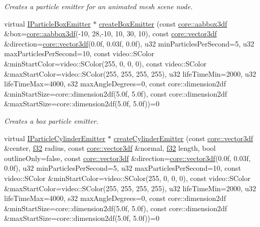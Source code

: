 \begin{DoxyCompactItemize}
\begin{DoxyCompactList}\small\item\em Creates a particle emitter for an animated mesh scene node. \end{DoxyCompactList}\item 
virtual \hyperlink{classirr_1_1scene_1_1IParticleBoxEmitter}{I\+Particle\+Box\+Emitter} $\ast$ \hyperlink{classirr_1_1scene_1_1IParticleSystemSceneNode_ae5f92fb41680b5da357c42cbb44e1675}{create\+Box\+Emitter} (const \hyperlink{namespaceirr_1_1core_a60f4b4c744aba55f10530d503c6ecb04}{core\+::aabbox3df} \&box=\hyperlink{namespaceirr_1_1core_a60f4b4c744aba55f10530d503c6ecb04}{core\+::aabbox3df}(-\/10, 28,-\/10, 10, 30, 10), const \hyperlink{namespaceirr_1_1core_ae6e2b2a6c552833ebbd5b7463d03586b}{core\+::vector3df} \&direction=\hyperlink{namespaceirr_1_1core_ae6e2b2a6c552833ebbd5b7463d03586b}{core\+::vector3df}(0.\+0f, 0.\+03f, 0.\+0f), u32 min\+Particles\+Per\+Second=5, u32 max\+Particles\+Per\+Second=10, const video\+::\+S\+Color \&min\+Start\+Color=video\+::\+S\+Color(255, 0, 0, 0), const video\+::\+S\+Color \&max\+Start\+Color=video\+::\+S\+Color(255, 255, 255, 255), u32 life\+Time\+Min=2000, u32 life\+Time\+Max=4000, s32 max\+Angle\+Degrees=0, const core\+::dimension2df \&min\+Start\+Size=core\+::dimension2df(5.\+0f, 5.\+0f), const core\+::dimension2df \&max\+Start\+Size=core\+::dimension2df(5.\+0f, 5.\+0f))=0
\begin{DoxyCompactList}\small\item\em Creates a box particle emitter. \end{DoxyCompactList}\item 
virtual \hyperlink{classirr_1_1scene_1_1IParticleCylinderEmitter}{I\+Particle\+Cylinder\+Emitter} $\ast$ \hyperlink{classirr_1_1scene_1_1IParticleSystemSceneNode_a191550f97d9f8a1ac7c6fefd78d84bf5}{create\+Cylinder\+Emitter} (const \hyperlink{namespaceirr_1_1core_ae6e2b2a6c552833ebbd5b7463d03586b}{core\+::vector3df} \&center, \hyperlink{namespaceirr_a0277be98d67dc26ff93b1a6a1d086b07}{f32} radius, const \hyperlink{namespaceirr_1_1core_ae6e2b2a6c552833ebbd5b7463d03586b}{core\+::vector3df} \&normal, \hyperlink{namespaceirr_a0277be98d67dc26ff93b1a6a1d086b07}{f32} length, bool outline\+Only=false, const \hyperlink{namespaceirr_1_1core_ae6e2b2a6c552833ebbd5b7463d03586b}{core\+::vector3df} \&direction=\hyperlink{namespaceirr_1_1core_ae6e2b2a6c552833ebbd5b7463d03586b}{core\+::vector3df}(0.\+0f, 0.\+03f, 0.\+0f), u32 min\+Particles\+Per\+Second=5, u32 max\+Particles\+Per\+Second=10, const video\+::\+S\+Color \&min\+Start\+Color=video\+::\+S\+Color(255, 0, 0, 0), const video\+::\+S\+Color \&max\+Start\+Color=video\+::\+S\+Color(255, 255, 255, 255), u32 life\+Time\+Min=2000, u32 life\+Time\+Max=4000, s32 max\+Angle\+Degrees=0, const core\+::dimension2df \&min\+Start\+Size=core\+::dimension2df(5.\+0f, 5.\+0f), const core\+::dimension2df \&max\+Start\+Size=core\+::dimension2df(5.\+0f, 5.\+0f))=0

\end{DoxyCompactItemize}
